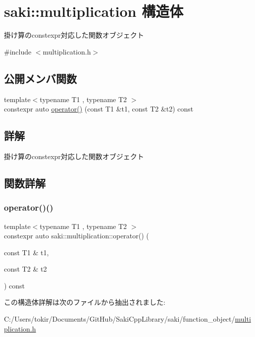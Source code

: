 \hypertarget{structsaki_1_1multiplication}{}\section{saki\+:\+:multiplication 構造体}
\label{structsaki_1_1multiplication}


掛け算のconstexpr対応した関数オブジェクト  




{\ttfamily \#include $<$multiplication.\+h$>$}

\subsection*{公開メンバ関数}
\begin{DoxyCompactItemize}
\item 
{\footnotesize template$<$typename T1 , typename T2 $>$ }\\constexpr auto \mbox{\hyperlink{structsaki_1_1multiplication_ad7c9cfc08911b6db3ea95d4cfd5ffa7f}{operator()}} (const T1 \&t1, const T2 \&t2) const
\end{DoxyCompactItemize}


\subsection{詳解}
掛け算のconstexpr対応した関数オブジェクト 

\subsection{関数詳解}
\mbox{\label{structsaki_1_1multiplication_ad7c9cfc08911b6db3ea95d4cfd5ffa7f}} 
\subsubsection{\texorpdfstring{operator()()}{operator()()}}
{\footnotesize\ttfamily template$<$typename T1 , typename T2 $>$ \\
constexpr auto saki\+::multiplication\+::operator() (\begin{DoxyParamCaption}\item[{const T1 \&}]{t1,  }\item[{const T2 \&}]{t2 }\end{DoxyParamCaption}) const\hspace{0.3cm}{\ttfamily [inline]}}



この構造体詳解は次のファイルから抽出されました\+:\begin{DoxyCompactItemize}
\item 
C\+:/\+Users/tokir/\+Documents/\+Git\+Hub/\+Saki\+Cpp\+Library/saki/function\+\_\+object/\mbox{\hyperlink{multiplication_8h}{multiplication.\+h}}\end{DoxyCompactItemize}
